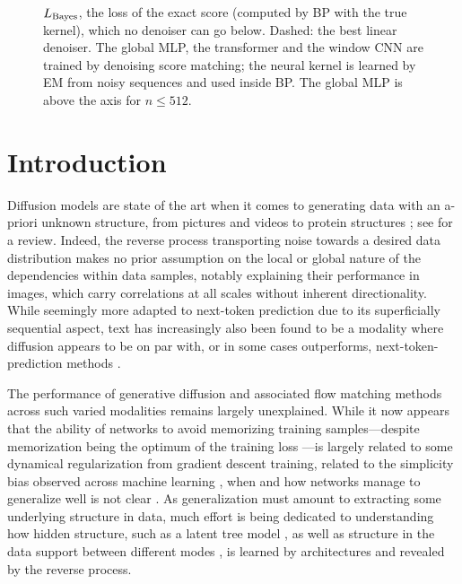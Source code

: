 \documentclass{article}
\begin{document}
\begin{figure}[t]
{  $L_{\rm Bayes}$, the loss of the exact score (computed by BP with the true kernel), which no denoiser can go below. Dashed: the best linear denoiser. The global MLP, the transformer and the window CNN are trained by denoising score
  matching; the neural kernel is learned by EM from noisy sequences and used inside BP. The global MLP is above the axis for $n\le512$.}
  \label{fig:summary}
\end{figure}

\section{Introduction}
\label{sec:intro}

Diffusion models are state of the art when it comes to generating data with an a-priori unknown structure, from pictures
\cite{rombach2022latent,betker2023dalle3} and videos \cite{veo3} to protein structures \cite{abramson2024alphafold3};
see \cite{yang2023diffusion} for a review. Indeed, the reverse process transporting noise towards a desired data distribution
\cite{sohl2015deep,ho2020denoising,song2021scorebased} makes no prior assumption on the local or global nature of the
dependencies within data samples, notably explaining their performance in images, which carry correlations at all
scales without inherent directionality. While seemingly more adapted to next-token prediction due to its superficially
sequential aspect, text has increasingly also been found to be a modality where diffusion appears to be on par with, or
in some cases outperforms, next-token-prediction methods \cite{lou2024discrete,sahoo2024simple,nie2025large}.

The performance of generative diffusion and associated flow matching methods across such varied modalities remains
largely unexplained. While it now appears that the ability of networks to avoid memorizing training samples---despite
memorization being the optimum of the training loss \cite{gu2023memorization}---is largely related to some dynamical
regularization from gradient descent training, related to the simplicity bias observed across machine learning
\cite{bonnaire2025memorize,favero2025bigger}, when and how networks manage to generalize well is not clear
\cite{marion2026understanding}. As generalization must amount to extracting some underlying structure in data, much
effort is being dedicated to understanding how hidden structure, such as a latent tree model
\cite{sclocchi2025phase,garnierbrun2024transformers,mei2024unets}, as well as structure in the data support between
different modes \cite{biroli2023generative,biroli2024dynamical,achilli2026speciation,garnierbrun2026foam}, is learned by
architectures and revealed by the reverse process.
\end{document}
